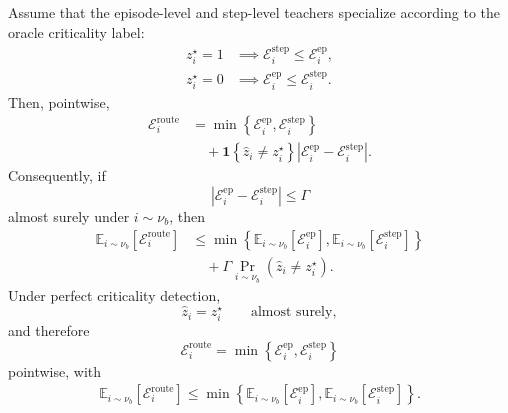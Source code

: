 \begin{proposition}
\label{prop:routing_regret}
Assume that the episode-level and step-level teachers specialize according
to the oracle criticality label:
\begin{equation}
\begin{aligned}
 z_i^\star=1
 &\implies
 \mathcal E_i^{\mathrm{step}}
 \le
 \mathcal E_i^{\mathrm{ep}},
 \\
 z_i^\star=0
 &\implies
 \mathcal E_i^{\mathrm{ep}}
 \le
 \mathcal E_i^{\mathrm{step}}.
\end{aligned}
\label{eq:routing_specialization}
\end{equation}
Then, pointwise,
\begin{equation}
\begin{aligned}
 \mathcal E_i^{\mathrm{route}}
 &=
 \min
 \left\{
   \mathcal E_i^{\mathrm{ep}},
   \mathcal E_i^{\mathrm{step}}
 \right\}
 \\
 &\quad+
 \mathbf 1
 \left\{
   \widehat z_i\ne z_i^\star
 \right\}
 \left|
   \mathcal E_i^{\mathrm{ep}}
   -
   \mathcal E_i^{\mathrm{step}}
 \right|.
\end{aligned}
\label{eq:routing_regret_identity}
\end{equation}
Consequently, if
\begin{equation}
 \left|
   \mathcal E_i^{\mathrm{ep}}
   -
   \mathcal E_i^{\mathrm{step}}
 \right|
 \le
 \Gamma
\label{eq:routing_gap_bound}
\end{equation}
almost surely under \(i\sim\nu_b\), then
\begin{equation}
\begin{aligned}
 \mathbb E_{i\sim\nu_b}
 \left[
   \mathcal E_i^{\mathrm{route}}
 \right]
 &\le
 \min
 \left\{
   \mathbb E_{i\sim\nu_b}
   \left[
     \mathcal E_i^{\mathrm{ep}}
   \right],
   \mathbb E_{i\sim\nu_b}
   \left[
     \mathcal E_i^{\mathrm{step}}
   \right]
 \right\}
 \\
 &\quad+
 \Gamma
 \Pr_{i\sim\nu_b}
 \left(
   \widehat z_i\ne z_i^\star
 \right).
\end{aligned}
\label{eq:routing_expected_bound}
\end{equation}
Under perfect criticality detection,
\begin{equation*}
 \widehat z_i=z_i^\star
 \qquad
 \text{almost surely},
\end{equation*}
and therefore
\begin{equation*}
 \mathcal E_i^{\mathrm{route}}
 =
 \min
 \left\{
   \mathcal E_i^{\mathrm{ep}},
   \mathcal E_i^{\mathrm{step}}
 \right\}
\end{equation*}
pointwise, with
\begin{equation*}
\begin{aligned}
 \mathbb E_{i\sim\nu_b}
 \left[
   \mathcal E_i^{\mathrm{route}}
 \right]
 \le
 \min
 \left\{
   \mathbb E_{i\sim\nu_b}
   \left[
     \mathcal E_i^{\mathrm{ep}}
   \right],
   \mathbb E_{i\sim\nu_b}
   \left[
     \mathcal E_i^{\mathrm{step}}
   \right]
 \right\}.
\end{aligned}
\end{equation*}
\end{proposition}

